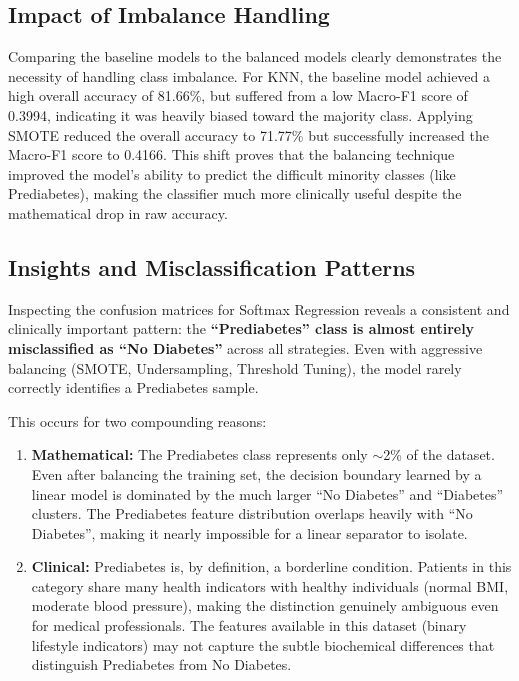 \documentclass[12pt, a4paper]{article}
\begin{document}
\subsection{Impact of Imbalance Handling}
Comparing the baseline models to the balanced models clearly demonstrates the necessity of handling class imbalance. For KNN, the baseline model achieved a high overall accuracy of 81.66\%, but suffered from a low Macro-F1 score of 0.3994, indicating it was heavily biased toward the majority class. Applying SMOTE reduced the overall accuracy to 71.77\% but successfully increased the Macro-F1 score to 0.4166. This shift proves that the balancing technique improved the model's ability to predict the difficult minority classes (like Prediabetes), making the classifier much more clinically useful despite the mathematical drop in raw accuracy.

\subsection{Insights and Misclassification Patterns}
Inspecting the confusion matrices for Softmax Regression reveals a consistent and clinically important pattern: the \textbf{``Prediabetes'' class is almost entirely misclassified as ``No Diabetes''} across all strategies. Even with aggressive balancing (SMOTE, Undersampling, Threshold Tuning), the model rarely correctly identifies a Prediabetes sample.

This occurs for two compounding reasons:
\begin{enumerate}
    \item \textbf{Mathematical:} The Prediabetes class represents only $\sim$2\% of the dataset. Even after balancing the training set, the decision boundary learned by a linear model is dominated by the much larger ``No Diabetes'' and ``Diabetes'' clusters. The Prediabetes feature distribution overlaps heavily with ``No Diabetes'', making it nearly impossible for a linear separator to isolate.
    \item \textbf{Clinical:} Prediabetes is, by definition, a borderline condition. Patients in this category share many health indicators with healthy individuals (normal BMI, moderate blood pressure), making the distinction genuinely ambiguous even for medical professionals. The features available in this dataset (binary lifestyle indicators) may not capture the subtle biochemical differences that distinguish Prediabetes from No Diabetes.
\end{enumerate}
\end{document}

